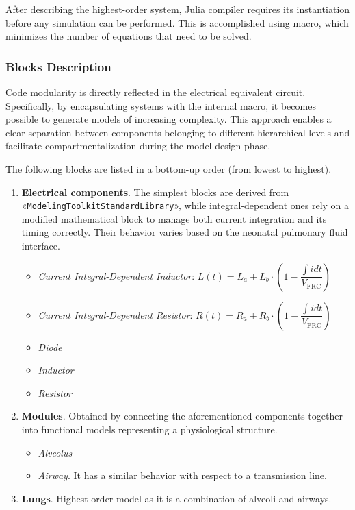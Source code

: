 After describing the highest-order system, Julia compiler requires its
instantiation before any simulation can be performed.  This is
accomplished using  macro, which minimizes the number
of equations that need to be solved.

\subsubsection{Blocks Description}
\label{subsubsec:blocks_description}

Code modularity is directly reflected in the electrical equivalent
circuit.  Specifically, by encapsulating systems with the internal
 macro, it becomes possible to generate models of
increasing complexity.  This approach enables a clear separation
between components belonging to different hierarchical levels and
facilitate compartmentalization during the model design phase.


The following blocks are listed in a bottom-up order (from lowest to
highest).

\begin{enumerate}
\item \textbf{Electrical components}.  The simplest blocks are derived
  from «\texttt{ModelingToolkitStandardLibrary}», while
  integral-dependent ones rely on a modified mathematical block to
  manage both current integration and its timing correctly.  Their
  behavior varies based on the neonatal pulmonary fluid interface.
  \begin{itemize}
  \item \emph{Current Integral-Dependent Inductor}:
    $L(t) = L_{a} + L_{b}\cdot \left(1 - \dfrac{\int {i
          dt}}{V_{\text{FRC}}}\right)$
  \item \emph{Current Integral-Dependent Resistor}:
    $R(t) = R_{a} + R_{b}\cdot \left(1 - \dfrac{\int {i
          dt}}{V_{\text{FRC}}}\right)$
  \item \emph{Diode}
  \item \emph{Inductor}
  \item \emph{Resistor}
  \end{itemize}
\item \textbf{Modules}.  Obtained by connecting the aforementioned
  components together into functional models representing a
  physiological structure.
  \begin{itemize}
  \item
    \emph{Alveolus}
  \item \emph{Airway}.  It has a similar behavior with respect to a
    transmission line.
  \end{itemize}
\item \textbf{Lungs}.  Highest order model as it is a combination of
  alveoli and airways.
\end{enumerate}

